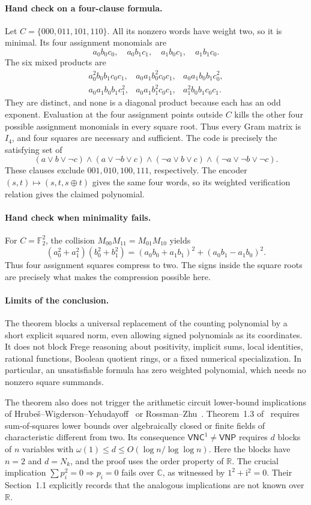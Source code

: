 \documentclass[11pt]{article}
\theoremstyle{definition}
\theoremstyle{remark}
\begin{document}
\paragraph{Hand check on a four-clause formula.}
Let $C=\{000,011,101,110\}$.
All its nonzero words have weight two, so it is minimal.
Its four assignment monomials are
\[
 a_0b_0c_0,\quad a_0b_1c_1,\quad a_1b_0c_1,\quad a_1b_1c_0.
\]
The six mixed products are
\[
\begin{array}{lll}
a_0^2b_0b_1c_0c_1,&a_0a_1b_0^2c_0c_1,&a_0a_1b_0b_1c_0^2,\\
a_0a_1b_0b_1c_1^2,&a_0a_1b_1^2c_0c_1,&a_1^2b_0b_1c_0c_1.
\end{array}
\]
They are distinct, and none is a diagonal product because each has
an odd exponent.  Evaluation at the four assignment points outside
$C$ kills the other four possible assignment monomials in every
square root.  Thus every Gram matrix is $I_4$, and four squares are
necessary and sufficient.
The code is precisely the satisfying set of
\[
 (a\vee b\vee\neg c)\wedge(a\vee\neg b\vee c)
 \wedge(\neg a\vee b\vee c)\wedge(\neg a\vee\neg b\vee\neg c).
\]
These clauses exclude $001,010,100,111$, respectively.
The encoder $(s,t)\mapsto(s,t,s\oplus t)$ gives the same four words,
so its weighted verification relation gives the claimed polynomial.

\paragraph{Hand check when minimality fails.}
For $C=\mathbb F_2^2$, the collision
$M_{00}M_{11}=M_{01}M_{10}$ yields
\[
 (a_0^2+a_1^2)(b_0^2+b_1^2)
 =(a_0b_0+a_1b_1)^2+(a_0b_1-a_1b_0)^2.
\]
Thus four assignment squares compress to two.  The signs inside the
square roots are precisely what makes the compression possible here.

\paragraph{Limits of the conclusion.}
The theorem blocks a universal replacement of the counting
polynomial by a short explicit squared norm, even allowing signed
polynomials as its coordinates.  It does not block Frege reasoning
about positivity, implicit sums, local identities, rational functions,
Boolean quotient rings, or a fixed numerical specialization.
In particular, an unsatisfiable formula has zero weighted polynomial,
which needs no nonzero square summands.

The theorem also does not trigger the arithmetic circuit lower-bound
implications of Hrube\v{s}--Wigderson--Yehudayoff~\cite{hwy} or
Rossman--Zhu~\cite{rz}. Theorem~1.3 of~\cite{rz} requires
sum-of-squares lower bounds over algebraically closed or finite fields
of characteristic different from two.  Its consequence
$\mathsf{VNC}^1\ne\mathsf{VNP}$ requires $d$ blocks of $n$ variables
with $\omega(1)\le d\le O(\log n/\log\log n)$.
Here the blocks have $n=2$ and $d=N_k$, and the proof uses the order
property of $\mathbb R$.  The crucial implication
$\sum p_i^2=0\Rightarrow p_i=0$ fails over $\mathbb C$, as witnessed
by $1^2+\mathrm{i}^2=0$.
Their Section~1.1 explicitly records that the analogous implications
are not known over $\mathbb R$.
\end{document}
